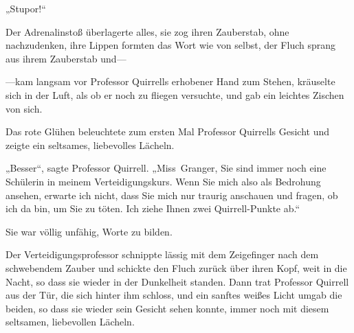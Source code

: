 „Stupor!“

Der Adrenalinstoß überlagerte alles, sie zog ihren Zauberstab, ohne nachzudenken, ihre Lippen formten das Wort wie von selbst, der Fluch sprang aus ihrem Zauberstab und—

—kam langsam vor Professor Quirrells erhobener Hand zum Stehen, kräuselte sich in der Luft, als ob er noch zu fliegen versuchte, und gab ein leichtes Zischen von sich.

Das rote Glühen beleuchtete zum ersten Mal Professor Quirrells Gesicht und zeigte ein seltsames, liebevolles Lächeln.

„Besser“, sagte Professor Quirrell. „Miss~Granger, Sie sind immer noch eine Schülerin in meinem Verteidigungskurs. Wenn Sie mich also als Bedrohung ansehen, erwarte ich nicht, dass Sie mich nur traurig anschauen und fragen, ob ich da bin, um Sie zu töten. Ich ziehe Ihnen zwei Quirrell-Punkte ab.“

Sie war völlig unfähig, Worte zu bilden.

Der Verteidigungsprofessor schnippte lässig mit dem Zeigefinger nach dem schwebendem Zauber und schickte den Fluch zurück über ihren Kopf, weit in die Nacht, so dass sie wieder in der Dunkelheit standen. Dann trat Professor Quirrell aus der Tür, die sich hinter ihm schloss, und ein sanftes weißes Licht umgab die beiden, so dass sie wieder sein Gesicht sehen konnte, immer noch mit diesem seltsamen, liebevollen Lächeln.

